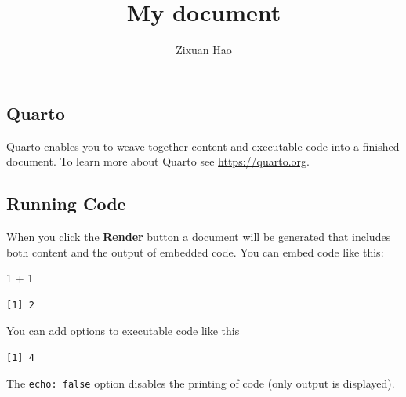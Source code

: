 \documentclass[
  letterpaper,
  DIV=11,
  numbers=noendperiod]{scrartcl}
\title{My document}
\author{Zixuan Hao}
\date{}
\newenvironment{Shaded}{\begin{snugshade}}{\end{snugshade}}
\newcommand{\DecValTok}[1]{\textcolor[rgb]{0.68,0.00,0.00}{#1}}
\newcommand{\SpecialCharTok}[1]{\textcolor[rgb]{0.37,0.37,0.37}{#1}}
\begin{document}
\maketitle


\subsection{Quarto}\label{quarto}

Quarto enables you to weave together content and executable code into a
finished document. To learn more about Quarto see
\url{https://quarto.org}.

\subsection{Running Code}\label{running-code}

When you click the \textbf{Render} button a document will be generated
that includes both content and the output of embedded code. You can
embed code like this:

\begin{Shaded}
\begin{Highlighting}[]
\DecValTok{1} \SpecialCharTok{+} \DecValTok{1}
\end{Highlighting}
\end{Shaded}

\begin{verbatim}
[1] 2
\end{verbatim}

You can add options to executable code like this

\begin{verbatim}
[1] 4
\end{verbatim}

The \texttt{echo:\ false} option disables the printing of code (only
output is displayed).
\end{document}
